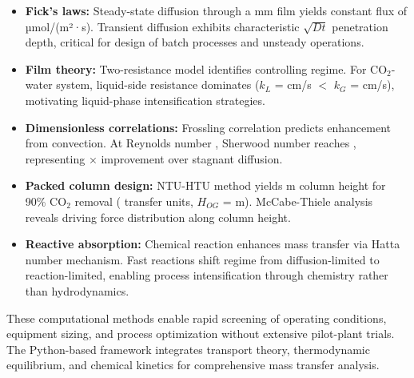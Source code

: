 \documentclass[11pt,a4paper]{article}
\begin{document}
\begin{itemize}
    \item \textbf{Fick's laws:} Steady-state diffusion through a  mm film yields constant flux of  µmol/(m²·s). Transient diffusion exhibits characteristic $\sqrt{Dt}$ penetration depth, critical for design of batch processes and unsteady operations.

    \item \textbf{Film theory:} Two-resistance model identifies controlling regime. For CO$_2$-water system, liquid-side resistance dominates ($k_L$ =  cm/s $<$ $k_G$ =  cm/s), motivating liquid-phase intensification strategies.

    \item \textbf{Dimensionless correlations:} Frossling correlation predicts enhancement from convection. At Reynolds number , Sherwood number reaches , representing × improvement over stagnant diffusion.

    \item \textbf{Packed column design:} NTU-HTU method yields  m column height for 90\% CO$_2$ removal ( transfer units, $H_{OG}$ =  m). McCabe-Thiele analysis reveals driving force distribution along column height.

    \item \textbf{Reactive absorption:} Chemical reaction enhances mass transfer via Hatta number mechanism. Fast reactions shift regime from diffusion-limited to reaction-limited, enabling process intensification through chemistry rather than hydrodynamics.
\end{itemize}

These computational methods enable rapid screening of operating conditions, equipment sizing, and process optimization without extensive pilot-plant trials. The Python-based framework integrates transport theory, thermodynamic equilibrium, and chemical kinetics for comprehensive mass transfer analysis.
\end{document}
